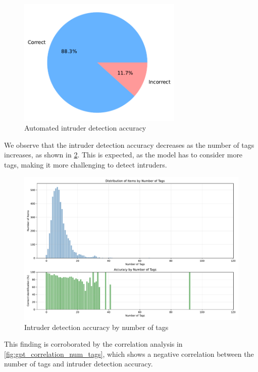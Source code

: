 \begin{figure}[h]
    \centering
    \includegraphics[width=0.7\textwidth]{figures/gpt_intruder_detection_accuracy.pdf}
    \caption{Automated intruder detection accuracy}
    \label{fig:gpt_intruder_detection_accuracy}
\end{figure}

We observe that the intruder detection accuracy decreases as the number of tags increases, as shown in \cref{fig:gpt_accuracy_by_num_tags}. This is expected, as the model has to consider more tags, making it more challenging to detect intruders.

\begin{figure}[h]
    \centering
    \includegraphics[width=\textwidth]{figures/gpt_accuracy_by_num_tags.pdf}
    \caption{Intruder detection accuracy by number of tags}
    \label{fig:gpt_accuracy_by_num_tags}
\end{figure}

This finding is corroborated by the correlation analysis in \cref{fig:gpt_correlation_num_tags}, which shows a negative correlation between the number of tags and intruder detection accuracy.

